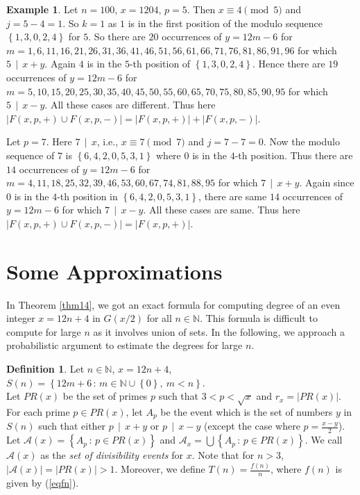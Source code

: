 \documentclass[11pt]{article}
\theoremstyle{definition}
\newtheorem{definition}[theorem]{Definition}
\newtheorem{example}[theorem]{Example}
\theoremstyle{remark}
\numberwithin{equation}{section}
\newcommand{\Nat}{\mathbb{N}}
\newcommand{\set}[1]{\left\{#1\right\}}
\newcommand{\Set}[2]{\set{#1\, :\, #2}}
\newcommand{\Mod}[3]{#1\equiv #2 \pmod{#3}}
\newcommand{\Div}[2]{#1\,\mid\, #2}
\begin{document}
\begin{example}
Let $n=100$, $x=1204$, $p=5$. Then $\Mod{x}{4}{5}$ and $j=5-4=1$. So $k=1$ as $1$ is in the first position of the modulo sequence $\set{1,3,0,2,4}$ for $5$. So there are $20$ occurrences of $y=12m-6$ for $m=1,6,11,16,21,26,31,36,41,46,51,56,61,66,71,76,81,86,91,96$ for which $\Div{5}{x+y}$. Again $4$ is in the $5$-th position of $\set{1,3,0,2,4}$. Hence there are $19$ occurrences of $y=12m-6$ for $m=5,10,15,20,25,30,35,40,45,50,55,60,65,70,75,80,85,90,95$ for which $\Div{5}{x-y}$. All these cases are different. Thus here $|F(x,p,+)\cup F(x,p,-)|=|F(x,p,+)|+|F(x,p,-)|$. 

\vspace{1em}
\noindent
Let $p=7$. Here $\Div{7}{x}$, i.e., $\Mod{x}{7}{7}$ and $j=7-7=0$. Now the modulo sequence of $7$ is $\set{6,4,2,0,5,3,1}$ where $0$ is in the $4$-th position. Thus there are $14$ occurrences of $y=12m-6$ for $m=4,11,18,25,32,39,46,53,60,67,74,81,88,95$ for which $\Div{7}{x+y}$. Again since $0$ is in the $4$-th position in $\set{6,4,2,0,5,3,1}$, there are same $14$ occurrences of $y=12m-6$ for which $\Div{7}{x-y}$. All these cases are same. Thus here $|F(x,p,+)\cup F(x,p,-)|=|F(x,p,+)|$.
\end{example}



\section{Some Approximations}

\noindent
In Theorem \ref{thm14}, we got an exact formula for computing degree of an even integer $x=12n+4$ in $G(x/2)$ for all $n\in\Nat$. This formula is difficult to compute for large $n$ as it involves union of sets. In the following, we approach a probabilistic argument to estimate the degrees for large $n$. 

\begin{definition}\label{defap}
Let $n\in\Nat$, $x=12n+4$, $S(n)=\Set{12m+6}{m\in\Nat\cup\set{0},\ m<n}$.\\
 Let $PR(x)$ be the set of primes $p$ such that $3<p<\sqrt{x}$ and $r_x=|PR(x)|$. For each prime $p\in PR(x)$, let $A_{p}$ be the event which is the set of numbers $y$ in $S(n)$ such that either $\Div{p}{x+y}$ or $\Div{p}{x-y}$ (except the case where $p=\frac{x-y}{2}$). Let $\mathscr{A}(x)=\Set{A_p}{p\in PR(x)}$ and $\mathscr{A}_x=\bigcup \Set{A_p}{p\in PR(x)}$. We call $\mathscr{A}(x)$ as the {\em set of divisibility events} for $x$. Note that for $n>3$, $|\mathscr{A}(x)|=|PR(x)|>1$. Moreover, we define $T(n)=\frac{f(n)}{n}$, where $f(n)$ is given by (\ref{eqfn}).
\end{definition}
\end{document}
